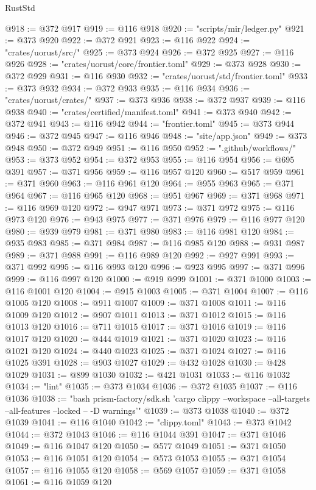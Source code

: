 \begin{lexlean}{RustStd}
\begin{coremodule}
@918 := @372 @917
@919 := @116 @918
@920 := "scripts/mir/ledger.py"
@921 := @373 @920
@922 := @372 @921
@923 := @116 @922
@924 := "crates/uorust/src/"
@925 := @373 @924
@926 := @372 @925
@927 := @116 @926
@928 := "crates/uorust/core/frontier.toml"
@929 := @373 @928
@930 := @372 @929
@931 := @116 @930
@932 := "crates/uorust/std/frontier.toml"
@933 := @373 @932
@934 := @372 @933
@935 := @116 @934
@936 := "crates/uorust/crates/"
@937 := @373 @936
@938 := @372 @937
@939 := @116 @938
@940 := "crates/certified/manifest.toml"
@941 := @373 @940
@942 := @372 @941
@943 := @116 @942
@944 := "frontier.toml"
@945 := @373 @944
@946 := @372 @945
@947 := @116 @946
@948 := "site/app.json"
@949 := @373 @948
@950 := @372 @949
@951 := @116 @950
@952 := ".github/workflows/"
@953 := @373 @952
@954 := @372 @953
@955 := @116 @954
@956 := @695 @391
@957 := @371 @956
@959 := @116 @957 @120
@960 := @517 @959
@961 := @371 @960
@963 := @116 @961 @120
@964 := @955 @963
@965 := @371 @964
@967 := @116 @965 @120
@968 := @951 @967
@969 := @371 @968
@971 := @116 @969 @120
@972 := @947 @971
@973 := @371 @972
@975 := @116 @973 @120
@976 := @943 @975
@977 := @371 @976
@979 := @116 @977 @120
@980 := @939 @979
@981 := @371 @980
@983 := @116 @981 @120
@984 := @935 @983
@985 := @371 @984
@987 := @116 @985 @120
@988 := @931 @987
@989 := @371 @988
@991 := @116 @989 @120
@992 := @927 @991
@993 := @371 @992
@995 := @116 @993 @120
@996 := @923 @995
@997 := @371 @996
@999 := @116 @997 @120
@1000 := @919 @999
@1001 := @371 @1000
@1003 := @116 @1001 @120
@1004 := @915 @1003
@1005 := @371 @1004
@1007 := @116 @1005 @120
@1008 := @911 @1007
@1009 := @371 @1008
@1011 := @116 @1009 @120
@1012 := @907 @1011
@1013 := @371 @1012
@1015 := @116 @1013 @120
@1016 := @711 @1015
@1017 := @371 @1016
@1019 := @116 @1017 @120
@1020 := @444 @1019
@1021 := @371 @1020
@1023 := @116 @1021 @120
@1024 := @440 @1023
@1025 := @371 @1024
@1027 := @116 @1025 @391
@1028 := @903 @1027
@1029 := @432 @1028
@1030 := @428 @1029
@1031 := @899 @1030
@1032 := @421 @1031
@1033 := @116 @1032
@1034 := "lint"
@1035 := @373 @1034
@1036 := @372 @1035
@1037 := @116 @1036
@1038 := "bash prism-factory/sdk.sh 'cargo clippy --workspace --all-targets --all-features --locked -- -D warnings'"
@1039 := @373 @1038
@1040 := @372 @1039
@1041 := @116 @1040
@1042 := "clippy.toml"
@1043 := @373 @1042
@1044 := @372 @1043
@1046 := @116 @1044 @391
@1047 := @371 @1046
@1049 := @116 @1047 @120
@1050 := @577 @1049
@1051 := @371 @1050
@1053 := @116 @1051 @120
@1054 := @573 @1053
@1055 := @371 @1054
@1057 := @116 @1055 @120
@1058 := @569 @1057
@1059 := @371 @1058
@1061 := @116 @1059 @120

\end{coremodule}
\end{lexlean}
